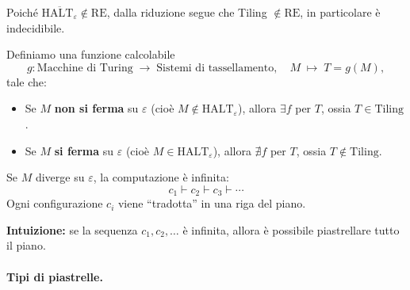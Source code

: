 Poiché $\overline{\mathrm{HALT}_\varepsilon} \notin \mathrm{RE}$, dalla riduzione segue che
Tiling $\notin \mathrm{RE}$, in particolare è indecidibile.
  
Definiamo una funzione calcolabile
\[
  g : \text{Macchine di Turing} \;\longrightarrow\; \text{Sistemi di tassellamento},
  \quad M \;\longmapsto\; T = g(M),
\]
tale che:
\begin{itemize}
  \item Se $M$ \textbf{non si ferma} su $\varepsilon$ (cioè $M \notin \mathrm{HALT}_\varepsilon$),
        allora $\exists f$ per $T$, ossia $T \in \text{Tiling}$.
      \item Se $M$ \textbf{si ferma} su $\varepsilon$ (cioè $M \in \mathrm{HALT}_\varepsilon$),
        allora $\nexists f$ per $T$, ossia $T \notin \text{Tiling}$.
\end{itemize}
  
Se $M$ diverge su $\varepsilon$, la computazione è infinita:
\[
  c_1 \vdash c_2 \vdash c_3 \vdash \cdots
\]
Ogni configurazione $c_i$ viene ``tradotta'' in una riga del piano.
 
\begin{center}
\end{center}
 
\noindent\textbf{Intuizione:} se la sequenza $c_1, c_2, \ldots$ è infinita, allora
è possibile piastrellare tutto il piano.
 
 
\paragraph{Tipi di piastrelle.}
 
